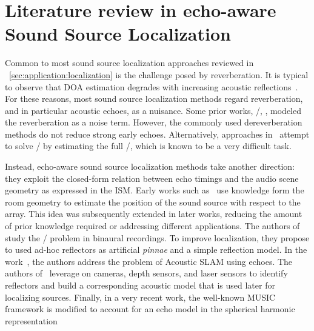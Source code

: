 

\section{Literature review in echo-aware Sound Source Localization}
Common to most sound source localization approaches reviewed in ~\cref{sec:application:localization} is the challenge posed by reverberation.
It is typical to observe that \acf{DOA} estimation degrades with increasing acoustic reflections~.
For these reasons, most sound source localization methods regard reverberation, and in particular acoustic echoes, as a nuisance.
Some prior works, \eg/, , modeled the reverberation as a noise term.
However, the commonly used dereverberation methods do not reduce strong early echoes.
Alternatively, approaches in~ attempt to solve \SSL/ by estimating the full \RIRs/, which is known to be a very difficult task.

\mynewline
Instead, echo-aware sound source localization methods take another direction:
they exploit the closed-form relation between echo timings and the audio scene geometry as expressed in the \acf{ISM}.
Early works such as~ use knowledge form the room geometry to estimate the position of the sound source with respect to the array.
This idea was subsequently extended in later works, reducing the amount of prior knowledge required or addressing different applications.
The authors of  study the \SSL/ problem in binaural recordings.
To improve localization, they propose to used ad-hoc reflectors as artificial \textit{pinnae} and a simple reflection model.
In the work~, the authors address the problem of Acoustic \ac{SLAM} using echoes.
The authors of~ leverage on cameras, depth sensors, and laser sensors to identify reflectors and build a corresponding acoustic model that is used later for localizing sources.
Finally, in a very recent work, the well-known \ac{MUSIC} framework is modified to account for an echo model in the spherical harmonic representation~

